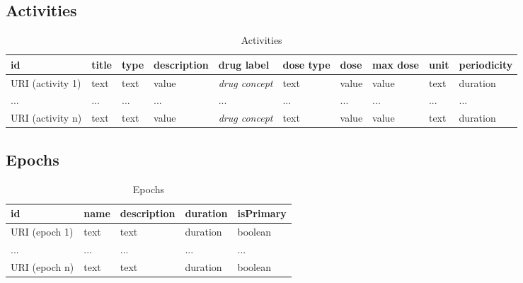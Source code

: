 \documentclass[a4paper,10pt]{article}
\begin{document}
\subsection*{Activities}
\begin{table}[h]
  \centering
  \caption{Activities}
  \small
  \label{table:Activities}
  \begin{tabular}{|l|l|l|l|l|l|l|l|l|l|}
    \hline
    \textbf{id}      & \textbf{title} & \textbf{type} & \textbf{description} & \textbf{drug label}   & \textbf{dose type} & \textbf{dose} & \textbf{max dose} & \textbf{unit} & \textbf{periodicity} \\ \hline
    URI (activity 1) & text           & text          & value                & \textit{drug concept} & text               & value         & value             & text          & duration             \\ \hline
    ...              & ...            & ...           & ...                  & ...                   & ...                & ...           & ...               & ...           & ...                  \\ \hline
    URI (activity n) & text           & text          & value                & \textit{drug concept} & text               & value         & value             & text          & duration             \\ \hline
  \end{tabular}
\end{table}

\subsection*{Epochs}
\begin{table}[h]
  \centering
  \caption{Epochs}
  \label{table:Epochs}
  \begin{tabular}{|l|l|l|l|l|}
    \hline
    \textbf{id} & \textbf{name} & \textbf{description} & \textbf{duration} & \textbf{isPrimary} \\ \hline
    URI (epoch 1)& text           & text                 & duration                & boolean  \\ \hline
    ...         & ...          & ...                 & ...                & ...  \\ \hline
    URI (epoch n)& text           & text                 & duration                & boolean  \\ \hline
  \end{tabular}
\end{table}
\end{document}
